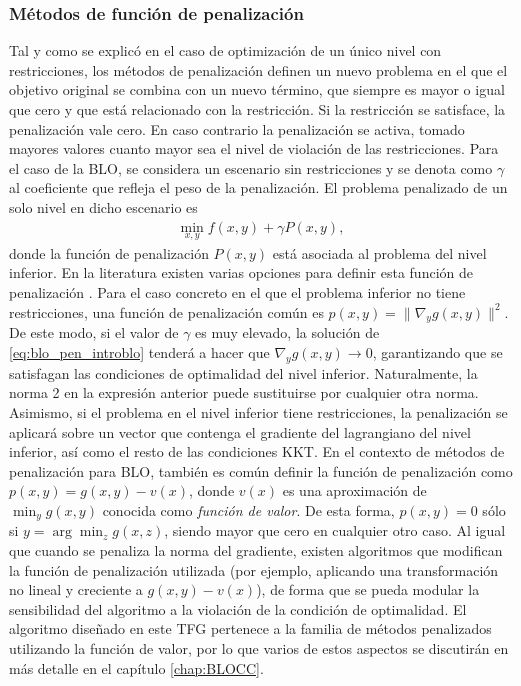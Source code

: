 
\subsubsection{Métodos de función de penalización} 
Tal y como se explicó en el caso de optimización de un único nivel con restricciones, los métodos de penalización definen un nuevo problema en el que el objetivo original se combina con un nuevo término, que siempre es mayor o igual que cero y que está relacionado con la restricción. Si la restricción se satisface, la penalización vale cero. En caso contrario la penalización se activa, tomado mayores valores cuanto mayor sea el nivel de violación de las restricciones. Para el caso de la BLO, se considera un escenario sin restricciones y se denota como $\gamma$ al coeficiente que refleja el peso de la penalización. El problema penalizado de un solo nivel en dicho escenario es
\begin{align}\label{eq:blo_pen_introblo}
    \min_{x,y} f(x,y) + \gamma P(x,y),
\end{align}
donde la función de penalización $P(x,y)$ está asociada al problema del nivel inferior. En la literatura existen varias opciones para definir esta función de penalización \cite{aiyoshi1981hierarchical,aiyoshi1984solution,ishizuka1992double}. Para el caso concreto en el que el problema inferior no tiene restricciones, una función de penalización común es $p(x,y)=\|\nabla_y g(x,y)\|^2$. De este modo, si el valor de $\gamma$ es muy elevado, la solución de \eqref{eq:blo_pen_introblo} tenderá a hacer que $\nabla_y g(x,y)\rightarrow 0$, garantizando que se satisfagan las condiciones de optimalidad del nivel inferior. Naturalmente, la norma 2 en la expresión anterior puede sustituirse por cualquier otra norma. Asimismo, si el problema en el nivel inferior tiene restricciones, la penalización se aplicará sobre un vector que contenga el gradiente del lagrangiano del nivel inferior, así como el resto de las condiciones KKT. En el contexto de métodos de penalización para BLO, también es común definir la función de penalización como $p(x,y)=g(x,y)-v(x)$, donde $v(x)$ es una aproximación de $\min_y g(x,y)$ conocida como \emph{función de valor}. De esta forma, $p(x,y)=0$ sólo si $y=\arg\min_z g(x,z)$, siendo mayor que cero en cualquier otro caso. Al igual que cuando se penaliza la norma del gradiente, existen algoritmos que modifican la función de penalización utilizada (por ejemplo, aplicando una transformación no lineal y creciente a $g(x,y)-v(x)$), de forma que se pueda modular la sensibilidad del algoritmo a la violación de la condición de optimalidad. El algoritmo diseñado en este TFG pertenece a la familia de métodos penalizados utilizando la función de valor, por lo que varios de estos aspectos se discutirán en más detalle en el capítulo \ref{chap:BLOCC}.


